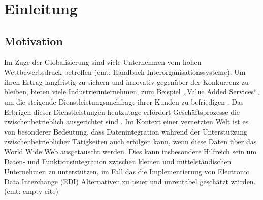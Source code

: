 \section{Einleitung}
\subsection{Motivation}
Im Zuge der Globalisierung sind viele Unternehmen vom hohen Wettbewerbsdruck betroffen (cmt: Handbuch Interorganisationssysteme). Um ihren Ertrag langfristig zu sichern und innovativ gegenüber der Konkurrenz zu bleiben, bieten viele Industrieunternehmen, zum Beispiel ,,Value Added Services``, um die steigende Dienstleistungsnachfrage ihrer Kunden zu befriedigen \citep[vgl.][S. 4]{Meffert2015}. Das Erbrigen dieser Dienstleistungen heutzutage erfördert Geschäftsprozesse die zwischenbetrieblich ausgerichtet sind \parencite[vgl.][S.19]{fleisch2001netzwerkunternehmen}. Im Kontext einer vernetzten Welt \parencite[vgl.]{bmwi2013} ist es von besonderer Bedeutung, dass Datenintegration während der Unterstützung zwischenbetrieblicher Tätigkeiten auch erfolgen kann, wenn diese Daten über das World Wide Web ausgetauscht werden. Dies kann insbesondere Hilfreich sein um Daten- und Funktionsintegration zwischen kleinen und mittelständischen Unternehmen zu unterstützen, im Fall das die Implementierung von Electronic Data Interchange (EDI) Alternativen zu teuer und unrentabel geschätzt würden. (cmt: empty cite)

